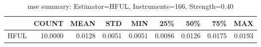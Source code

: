 \begin{table}[ht]
\centering
\caption{mse summary: Estimator=HFUL, Instruments=166, Strength=0.40}
\begin{tabular}{lrrrrrrrr}
\toprule
 & COUNT & MEAN & STD & MIN & 25\% & 50\% & 75\% & MAX \\
\midrule
HFUL & 10.0000 & 0.0128 & 0.0051 & 0.0051 & 0.0086 & 0.0126 & 0.0175 & 0.0193 \\
\bottomrule
\end{tabular}
\end{table}
